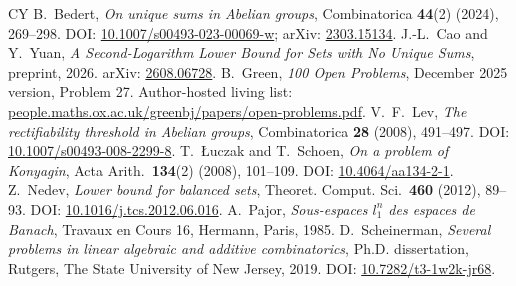 \documentclass[10pt]{article}
\theoremstyle{plain}
\begin{document}
\begin{thebibliography}{CY}
 B.~Bedert, \emph{On unique sums in Abelian groups},
Combinatorica \textbf{44}(2) (2024), 269--298.
DOI: \href{https://doi.org/10.1007/s00493-023-00069-w}{10.1007/s00493-023-00069-w};
arXiv: \href{https://arxiv.org/abs/2303.15134}{2303.15134}.
 J.-L.~Cao and Y.~Yuan, \emph{A Second-Logarithm Lower
Bound for Sets with No Unique Sums}, preprint, 2026.
arXiv: \href{https://arxiv.org/abs/2608.06728}{2608.06728}.
 B.~Green, \emph{100 Open Problems}, December 2025 version,
Problem 27. Author-hosted living list:
\href{https://people.maths.ox.ac.uk/greenbj/papers/open-problems.pdf}
{people.maths.ox.ac.uk/greenbj/papers/open-problems.pdf}.
 V.~F.~Lev, \emph{The rectifiability threshold in Abelian
groups}, Combinatorica \textbf{28} (2008), 491--497.
DOI: \href{https://doi.org/10.1007/s00493-008-2299-8}
{10.1007/s00493-008-2299-8}.
 T.~{\L}uczak and T.~Schoen, \emph{On a problem of Konyagin},
Acta Arith.\ \textbf{134}(2) (2008), 101--109.
DOI: \href{https://doi.org/10.4064/aa134-2-1}{10.4064/aa134-2-1}.
 Z.~Nedev, \emph{Lower bound for balanced sets},
Theoret. Comput. Sci.\ \textbf{460} (2012), 89--93.
DOI: \href{https://doi.org/10.1016/j.tcs.2012.06.016}
{10.1016/j.tcs.2012.06.016}.
 A.~Pajor, \emph{Sous-espaces $l_1^n$ des espaces de Banach},
Travaux en Cours 16, Hermann, Paris, 1985.
 D.~Scheinerman, \emph{Several problems in linear
algebraic and additive combinatorics}, Ph.D. dissertation, Rutgers, The State
University of New Jersey, 2019.
DOI: \href{https://doi.org/10.7282/t3-1w2k-jr68}
{10.7282/t3-1w2k-jr68}.
\end{thebibliography}
\end{document}
